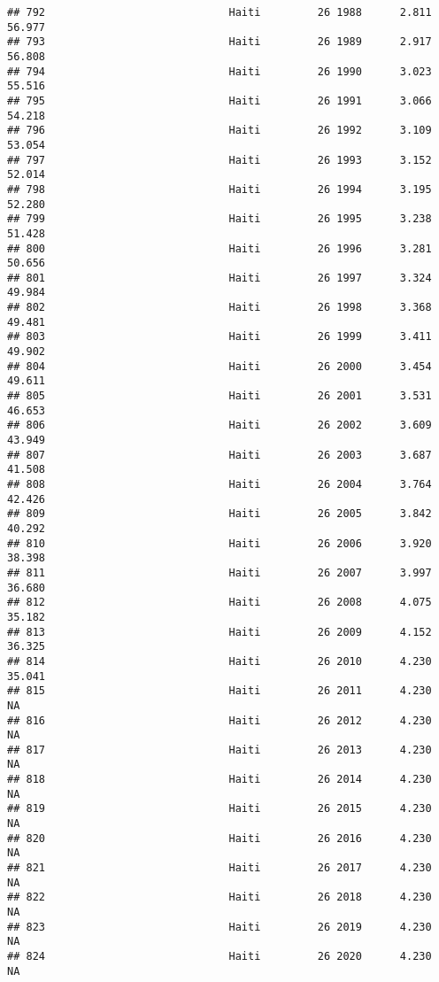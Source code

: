 \documentclass[
]{article}
\begin{document}
\begin{verbatim}
## 792                             Haiti         26 1988      2.811     56.977
## 793                             Haiti         26 1989      2.917     56.808
## 794                             Haiti         26 1990      3.023     55.516
## 795                             Haiti         26 1991      3.066     54.218
## 796                             Haiti         26 1992      3.109     53.054
## 797                             Haiti         26 1993      3.152     52.014
## 798                             Haiti         26 1994      3.195     52.280
## 799                             Haiti         26 1995      3.238     51.428
## 800                             Haiti         26 1996      3.281     50.656
## 801                             Haiti         26 1997      3.324     49.984
## 802                             Haiti         26 1998      3.368     49.481
## 803                             Haiti         26 1999      3.411     49.902
## 804                             Haiti         26 2000      3.454     49.611
## 805                             Haiti         26 2001      3.531     46.653
## 806                             Haiti         26 2002      3.609     43.949
## 807                             Haiti         26 2003      3.687     41.508
## 808                             Haiti         26 2004      3.764     42.426
## 809                             Haiti         26 2005      3.842     40.292
## 810                             Haiti         26 2006      3.920     38.398
## 811                             Haiti         26 2007      3.997     36.680
## 812                             Haiti         26 2008      4.075     35.182
## 813                             Haiti         26 2009      4.152     36.325
## 814                             Haiti         26 2010      4.230     35.041
## 815                             Haiti         26 2011      4.230         NA
## 816                             Haiti         26 2012      4.230         NA
## 817                             Haiti         26 2013      4.230         NA
## 818                             Haiti         26 2014      4.230         NA
## 819                             Haiti         26 2015      4.230         NA
## 820                             Haiti         26 2016      4.230         NA
## 821                             Haiti         26 2017      4.230         NA
## 822                             Haiti         26 2018      4.230         NA
## 823                             Haiti         26 2019      4.230         NA
## 824                             Haiti         26 2020      4.230         NA

\end{verbatim}
\end{document}
